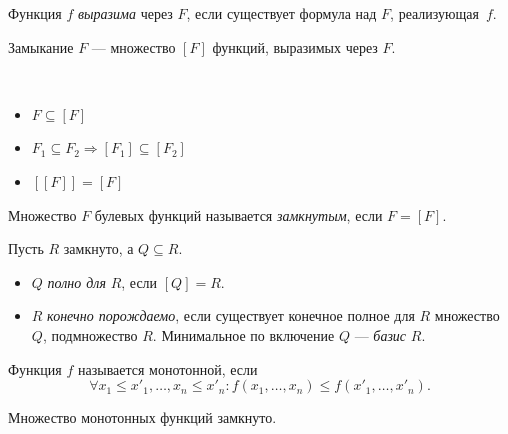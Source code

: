 \documentclass[12pt,a4paper]{article}
\begin{document}
    \begin{definition}
        Функция $f$ \emph{выразима} через $F$, если существует формула над $F$, реализующая~$f$.
    \end{definition}

    \begin{definition}
        Замыкание $F$ --- множество $[F]$ функций, выразимых через $F$. 
    \end{definition}

    \begin{statement}\ 
        \begin{itemize}
            \item $F \subseteq [F]$
            \item $F_1 \subseteq F_2 \Rightarrow [F_1] \subseteq [F_2]$
            \item $[[F]] = [F]$
        \end{itemize}
    \end{statement}

    \begin{definition}
        Множество $F$ булевых функций называется \emph{замкнутым}, если $F = [F]$.
    \end{definition}

    \begin{definition}
        Пусть $R$ замкнуто, а $Q\subseteq R$.
        \begin{itemize}
            \item $Q$ \emph{полно для} $R$, если $[Q] = R$.
            \item $R$ \emph{конечно порождаемо}, если существует конечное полное для $R$ множество $Q$, подмножество $R$. Минимальное по включение $Q$ --- \emph{базис} $R$.
        \end{itemize}
    \end{definition}

    \begin{definition}
        Функция $f$ называется монотонной, если \[\forall x_1 \leqslant x'_1, \dots, x_n \leqslant x'_n : f(x_1, \dots, x_n) \leqslant f(x'_1, \dots, x'_n).\]
    \end{definition}

    \begin{statement}
        Множество монотонных функций замкнуто.
    \end{statement}
\end{document}
